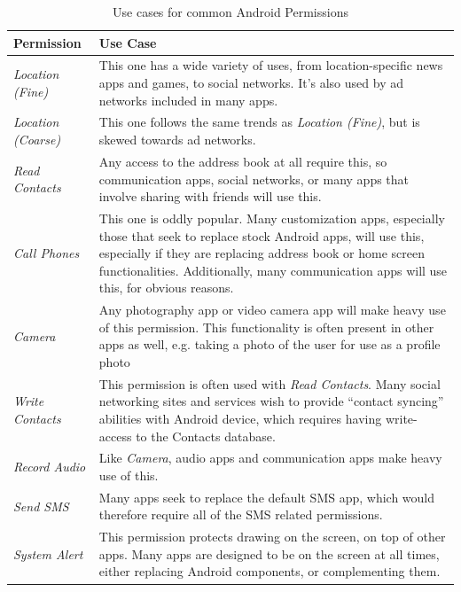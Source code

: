 \begin{table}[h]
\begin{small}
\begin{tabular}{p{3cm}|p{12.5cm}}
Permission & Use Case \\
\hline

\textit{Location (Fine)} & This one has a wide variety of uses, from location-specific news apps and games, to social networks. It's also used by ad networks included in many apps.  \\
\textit{Location (Coarse)} & This one follows the same trends as \textit{Location (Fine)}, but is skewed towards ad networks.  \\
\textit{Read Contacts} & Any access to the address book at all require this, so communication apps, social networks, or many apps that involve sharing with friends will use this.  \\
\textit{Call Phones} & This one is oddly popular. Many customization apps, especially those that seek to replace stock Android apps, will use this, especially if they are replacing address book or home screen functionalities. Additionally, many communication apps will use this, for obvious reasons.  \\
\textit{Camera} & Any photography app or video camera app will make heavy use of this permission. This functionality is often present in other apps as well, e.g. taking a photo of the user for use as a profile photo  \\
\textit{Write Contacts} & This permission is often used with \textit{Read Contacts}. Many social networking sites and services wish to provide ``contact syncing'' abilities with Android device, which requires having write-access to the Contacts database.  \\
\textit{Record Audio} & Like \textit{Camera}, audio apps and communication apps make heavy use of this.  \\
\textit{Send SMS} & Many apps seek to replace the default SMS app, which would therefore require all of the SMS related permissions.  \\
\textit{System Alert} & This permission protects drawing on the screen, on top of other apps. Many apps are designed to be on the screen at all times, either replacing Android components, or complementing them.  \\

\end{tabular}
\end{small}
\caption{Use cases for common Android Permissions}
\label{tab:permissionsanduses}
\end{table}

